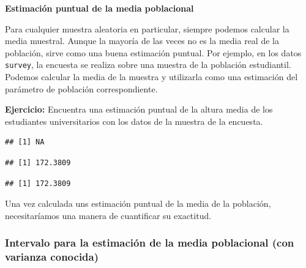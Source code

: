 \documentclass[]{article}
\newenvironment{Shaded}{\begin{snugshade}}{\end{snugshade}}
\newcommand{\KeywordTok}[1]{\textcolor[rgb]{0.13,0.29,0.53}{\textbf{{#1}}}}
\newcommand{\DataTypeTok}[1]{\textcolor[rgb]{0.13,0.29,0.53}{{#1}}}
\newcommand{\CommentTok}[1]{\textcolor[rgb]{0.56,0.35,0.01}{\textit{{#1}}}}
\newcommand{\OtherTok}[1]{\textcolor[rgb]{0.56,0.35,0.01}{{#1}}}
\newcommand{\NormalTok}[1]{{#1}}
\numberwithin{equation}{section}
\begin{document}
\textbf{Estimación puntual de la media poblacional}

Para cualquier muestra aleatoria en particular, siempre podemos calcular
la media muestral. Aunque la mayoría de las veces no es la media real de
la población, sirve como una buena estimación puntual. Por ejemplo, en
los datos \texttt{survey}, la encuesta se realiza sobre una muestra de
la población estudiantil. Podemos calcular la media de la muestra y
utilizarla como una estimación del parámetro de población
correspondiente.

\textbf{Ejercicio:} Encuentra una estimación puntual de la altura media
de los estudiantes universitarios con los datos de la muestra de la
encuesta.

\begin{Shaded}
\end{Shaded}

\begin{verbatim}
## [1] NA
\end{verbatim}

\begin{Shaded}
\end{Shaded}

\begin{verbatim}
## [1] 172.3809
\end{verbatim}

\begin{Shaded}
\end{Shaded}

\begin{verbatim}
## [1] 172.3809
\end{verbatim}

Una vez calculada uns estimación puntual de la media de la población,
necesitaríamos una manera de cuantificar su exactitud.

\subsubsection{Intervalo para la estimación de la media poblacional (con
varianza
conocida)}\label{intervalo-para-la-estimacion-de-la-media-poblacional-con-varianza-conocida}
\end{document}

